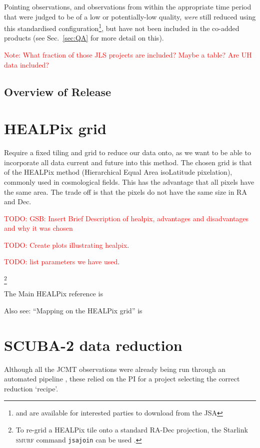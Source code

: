 \documentclass[usenatbib]{mn2e}
\newcommand{\sref}[1]{Sec.~\ref{#1}}
\newcommand{\todo}[1]{\textcolor{red}{TODO: #1}}
\newcommand{\note}[1]{\textcolor{red}{Note: #1}}
\begin{document}
Pointing observations, and observations from within the
appropriate time period that were judged to be of a low or
potentially-low quality, \emph{were} still reduced using this
standardised configuration\footnote{and are available for interested
  parties to download from the JSA}, but have not been included in the
co-added products (see \sref{sec:QA} for more detail on this).


\note{What fraction of those JLS projects are
  included? Maybe a table? Are UH data included?}

\subsection{Overview of Release}







\section{HEALPix grid }
Require a fixed tiling and grid to reduce our data onto, as we want to
be able to incorporate all data current and future into this
method. The chosen grid is that of the HEALPix method (Hierarchical
Equal Area isoLatitude pixelation), commonly used in cosmological
fields. This has the advantage that all pixels have the same area. The
trade off is that the pixels do not have the same size in RA and Dec.

\todo{GSB: Insert Brief Description of healpix, advantages and
  disadvantages and why it was chosen }

\todo{Create plots illustrating healpix}.

\todo{list parameters we have used}.

\footnote{To re-grid a HEALPix tile onto a standard RA-Dec projection,
  the Starlink \textsc{smurf} command \texttt{jsajoin} can be used
  \citep{SUN258}.}

The Main HEALPix reference is \citep{Gorski2005}

Also see: ``Mapping on the HEALPix grid'' is \citep{Calabretta2007}



\section{SCUBA-2 data reduction}
Although all the JCMT observations were already being run through an
automated pipeline \citep{2011scuba2dr,2015oracdr}, these relied on the PI for a
project selecting the correct reduction `recipe'.
\end{document}
